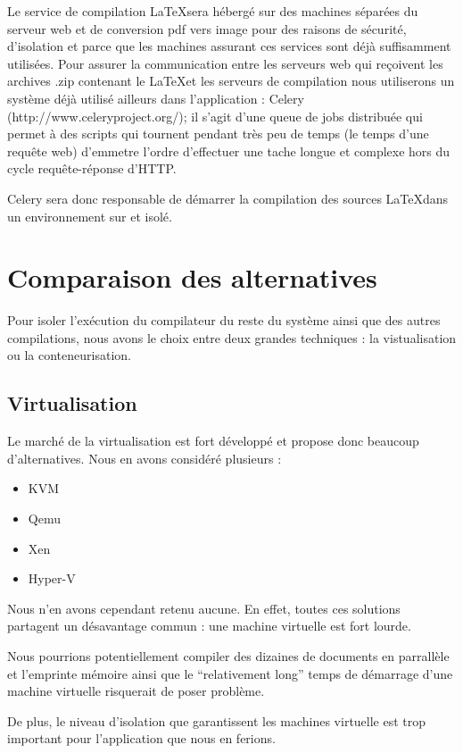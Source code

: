 \documentclass[10pt,a4paper]{article}
\begin{document}
Le service de compilation \LaTeX sera hébergé sur des machines séparées du serveur web et de conversion pdf vers image pour des raisons de sécurité, d'isolation et parce que les machines assurant ces services sont déjà suffisamment utilisées.
Pour assurer la communication entre les serveurs web qui reçoivent les archives .zip contenant le \LaTeX et les serveurs de compilation nous utiliserons un système déjà utilisé ailleurs dans l'application :
Celery (http://www.celeryproject.org/); il s'agit d'une queue de jobs distribuée qui permet à des scripts qui tournent pendant très peu de temps (le temps d'une requête web) d'emmetre l'ordre d'effectuer une tache longue et complexe hors du cycle requête-réponse d'HTTP.

Celery sera donc responsable de démarrer la compilation des sources \LaTeX dans un environnement sur et isolé.


\section{Comparaison des alternatives}
Pour isoler l'exécution du compilateur du reste du système ainsi que des autres compilations, nous avons le choix entre deux grandes techniques : la vistualisation ou la conteneurisation.

\subsection{Virtualisation}
Le marché de la virtualisation est fort développé et propose donc beaucoup d'alternatives. Nous en avons considéré plusieurs :
\begin{itemize}
    \item{KVM}
    \item{Qemu}
    \item{Xen}
    \item{Hyper-V}
\end{itemize}

Nous n'en avons cependant retenu aucune. En effet, toutes ces solutions partagent un désavantage commun : une machine virtuelle est fort lourde.

Nous pourrions potentiellement compiler des dizaines de documents en parrallèle et l'emprinte mémoire ainsi que le ``relativement long'' temps de démarrage d'une machine virtuelle risquerait de poser problème.

De plus, le niveau d'isolation que garantissent les machines virtuelle est trop important pour l'application que nous en ferions.
\end{document}
